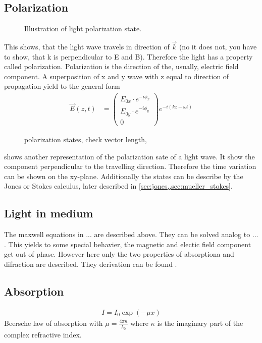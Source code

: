 \subsection{Polarization}
% 
\begin{figure}[!t]
\centering
\def\tikzwidth{\textwidth}
\label{fig:polarization_state}
\caption{Illustration of light polarization state.}
\end{figure}
% 
This shows, that the light wave travels in direction of $\vec{k}$ (no it does not, you have to show, that k is perpendicular to E and B).
Therefore the light has a property called polarization.
Polarization is the direction of the, usually, electric field component.
% 
A superposition of x and y wave with z equal to direction of propagation yield to the general form
\begin{align}
\vec{E}(z,t) &= \begin{pmatrix} E_{0x} \cdot e^{ -i \phi_x } \\ E_{0y} \cdot e^{ -i \phi_y } \\ 0 \end{pmatrix}
e^{ -i (kz - \omega t)}
\end{align}
%
\begin{figure}[!t]
\centering
\tikzset{external/export=false}

\caption{polarization states, check vector length,} 
\label{fig:polarization_state_vectors}
\end{figure}
%
 shows another representation of the polarization sate of a light wave.
It show the component perpendicular to the travelling direction.
Therefore the time variation can be shown on the xy-plane.
Additionally the states can be describe by the Jones or Stokes calculus, later described in \cref{sec:jones,,sec:mueller_stokes}.
% 
% 
% 
\subsection{Light in medium}
% 
The maxwell equations in ... are described above. They can be solved analog to ... . This yields to some special behavier, \eg{} the magnetic and electic field component get out of phase.
However here only the two properties of absorptiona and difraction are described.
They derivation can be found \eg{} \cite{demtroeder2, Fliebach2012}.
% 
\subsection{Absorption}
% 
\begin{align}
    I = I_0 \exp(-\mu x)
\end{align}
% 
Beersche law of absorption with $\mu = \frac{4\pi \kappa}{\lambda_0}$ where $\kappa$ is the imaginary part of the complex refractive index.
% 
